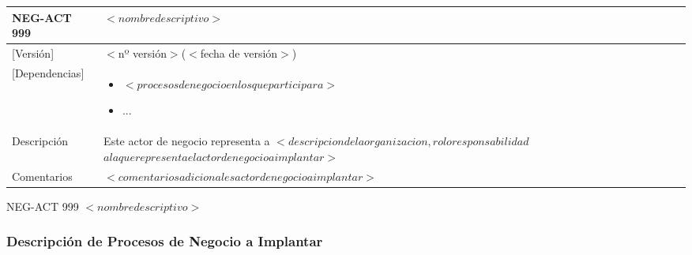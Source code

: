  
 \begin{Artefacto}[H]
    \centering
    \begin{tabular}{|p{3cm}|p{10cm}|}
        \hline
         \cellcolor{gray30}  NEG-ACT 999	&  $<nombre descriptivo>$\\ 
        \hline
         \cellcolor{gray30}  [Versión]	&  $<$nº versión$>$($<$fecha de versión$>$)\\   
         \hline
         \cellcolor{gray30}  [Dependencias] &  	\begin{itemize} \item $<procesos de negocio  en los que participara>$
\item	... \end{itemize}\\  
        \hline
         \cellcolor{gray30} Descripción	& Este actor de negocio  representa a $<descripcion de la organizacion, rol  o responsabilidad$ $  a la que representa  el actor de negocio a implantar>$  \\
        \hline
         \cellcolor{gray30}  Comentarios	&$<comentarios adicionales actor de negocio  a implantar>$\\   
        \hline
  
    \end{tabular}
\caption{NEG-ACT 999	$<nombre descriptivo>$ }
  \end{Artefacto}




\subsubsection{Descripción de Procesos de Negocio a Implantar}
 

